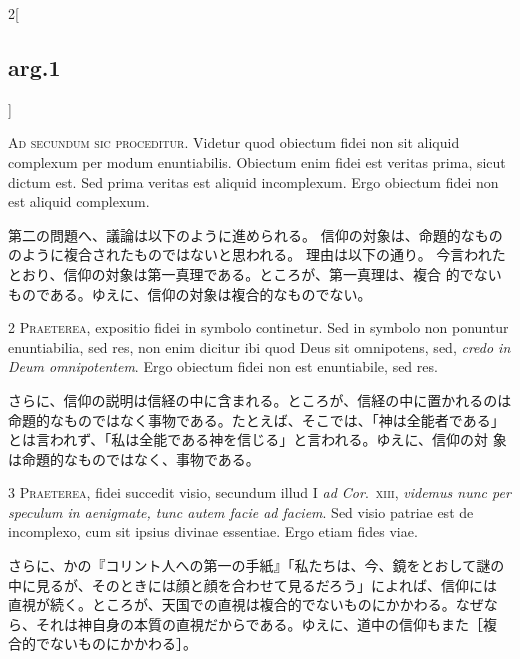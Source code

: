 \documentclass[paper=a4paper,fontsize=10pt,jafontsize=9pt,titlepage]{jlreq}
\begin{document}
\begin{paracol}{2}[\subsection{arg.1}]

{\huge A}{\scshape d secundum sic proceditur}. Videtur
quod obiectum fidei non sit aliquid complexum per modum
enuntiabilis. Obiectum enim fidei est veritas prima, sicut dictum
est. Sed prima veritas est aliquid incomplexum. Ergo obiectum fidei non
est aliquid complexum.

\switchcolumn

第二の問題へ、議論は以下のように進められる。
信仰の対象は、命題的なもののように複合されたものではないと思われる。
理由は以下の通り。
今言われたとおり、信仰の対象は第一真理である。ところが、第一真理は、複合
 的でないものである。ゆえに、信仰の対象は複合的なものでない。


{\scshape 2 Praeterea}, expositio fidei in symbolo
continetur. Sed in symbolo non ponuntur enuntiabilia, sed res, non enim
dicitur ibi quod Deus sit omnipotens, sed, {\itshape credo in Deum
omnipotentem}. Ergo obiectum fidei non est enuntiabile, sed res.

\switchcolumn

さらに、信仰の説明は信経の中に含まれる。ところが、信経の中に置かれるのは
 命題的なものではなく事物である。たとえば、そこでは、「神は全能者である」
 とは言われず、「私は全能である神を信じる」と言われる。ゆえに、信仰の対
 象は命題的なものではなく、事物である。


{\scshape 3 Praeterea}, fidei succedit visio, secundum illud I {\itshape
ad Cor}.~{\scshape xiii}, {\itshape videmus nunc per speculum in
aenigmate, tunc autem facie ad faciem}. Sed visio patriae est de
incomplexo, cum sit ipsius divinae essentiae. Ergo etiam fides viae.

\switchcolumn

さらに、かの『コリント人への第一の手紙』「私たちは、今、鏡をとおして謎の
 中に見るが、そのときには顔と顔を合わせて見るだろう」によれば、信仰には
 直視が続く。ところが、天国での直視は複合的でないものにかかわる。なぜな
 ら、それは神自身の本質の直視だからである。ゆえに、道中の信仰もまた［複
 合的でないものにかかわる］。


\end{paracol}
\end{document}
